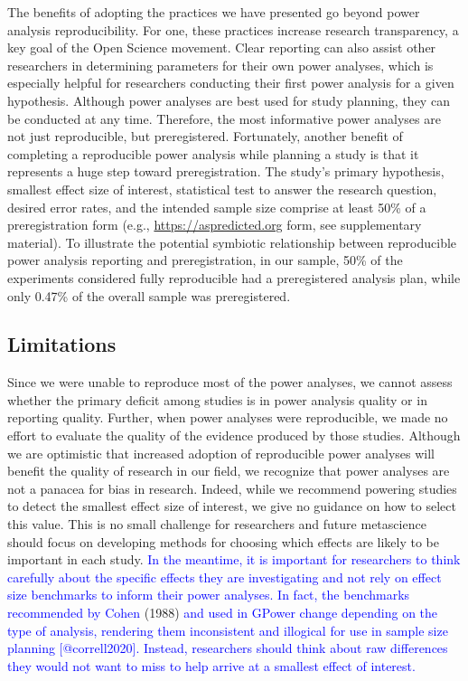\documentclass[
  man, donotrepeattitle,mask,floatsintext]{apa7}
\begin{document}
The benefits of adopting the practices we have presented go beyond power analysis reproducibility. For one, these practices increase research transparency, a key goal of the Open Science movement. Clear reporting can also assist other researchers in determining parameters for their own power analyses, which is especially helpful for researchers conducting their first power analysis for a given hypothesis. Although power analyses are best used for study planning, they can be conducted at any time. Therefore, the most informative power analyses are not just reproducible, but preregistered. Fortunately, another benefit of completing a reproducible power analysis while planning a study is that it represents a huge step toward preregistration. The study's primary hypothesis, smallest effect size of interest, statistical test to answer the research question, desired error rates, and the intended sample size comprise at least 50\% of a preregistration form (e.g., \url{https://aspredicted.org} form, see supplementary material). To illustrate the potential symbiotic relationship between reproducible power analysis reporting and preregistration, in our sample, 50\% of the experiments considered fully reproducible had a preregistered analysis plan, while only 0.47\% of the overall sample was preregistered.

\hypertarget{limitations}{%
\subsection{Limitations}\label{limitations}}

Since we were unable to reproduce most of the power analyses, we cannot assess whether the primary deficit among studies is in power analysis quality or in reporting quality. Further, when power analyses were reproducible, we made no effort to evaluate the quality of the evidence produced by those studies. Although we are optimistic that increased adoption of reproducible power analyses will benefit the quality of research in our field, we recognize that power analyses are not a panacea for bias in research. Indeed, while we recommend powering studies to detect the smallest effect size of interest, we give no guidance on how to select this value. This is no small challenge for researchers and future metascience should focus on developing methods for choosing which effects are likely to be important in each study. \textcolor{blue}{In the meantime, it is important for researchers to think carefully about the specific effects they are investigating and not rely on effect size benchmarks to inform their power analyses. In fact, the benchmarks recommended by Cohen} (1988) \textcolor{blue}{and used in G\*Power change depending on the type of analysis, rendering them inconsistent and illogical for use in sample size planning [@correll2020]. Instead, researchers should think about raw differences they would not want to miss to help arrive at a smallest effect of interest.}
\end{document}

